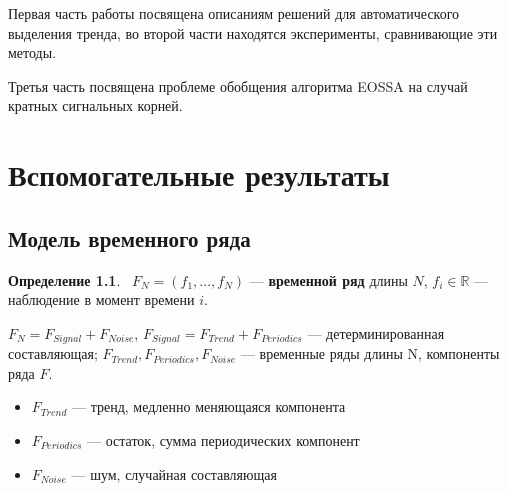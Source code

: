 \documentclass[specialist, substylefile = spbureport.rtx, subf,href,colorlinks=true, 12pt]{disser}
\theoremstyle{definition}
\newtheorem{definition}{Определение}
\begin{document}
Первая часть работы посвящена описаниям решений для автоматического выделения тренда, во второй части находятся эксперименты, сравнивающие эти методы.

Третья часть посвящена проблеме обобщения алгоритма EOSSA на случай кратных сигнальных корней.

\chapter{Вспомогательные результаты}
\label{ch:1}
\section{Модель временного ряда}
\begin{definition}
    ~$F_N = (f_1, \ldots, f_N)$ --- \textbf{временной ряд} длины $N$, $f_i \in \mathbb{R}$ --- наблюдение в момент времени $i$.

    $F_N = F_{Signal} + F_{Noise}$, $F_{Signal} = F_{Trend} + F_{Periodics}$ --- детерминированная составляющая; $F_{Trend}, F_{Periodics}, F_{Noise}$ --- временные ряды длины N, компоненты ряда $F$.
    \begin{itemize}
        \item $F_{Trend}$ --- тренд, медленно меняющаяся компонента
        \item $F_{Periodics}$ --- остаток, сумма периодических компонент
        \item $F_{Noise}$ --- шум, случайная составляющая
    \end{itemize}
\end{definition}
\end{document}

